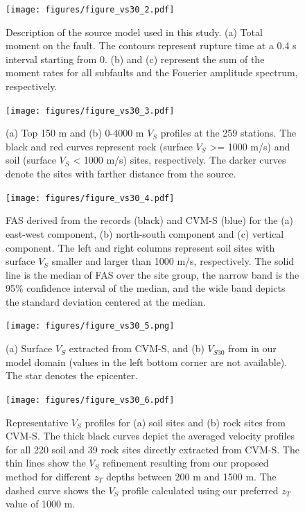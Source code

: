 \clearpage
\begin{figure}[!ht]
  \centering
  \texttt{[image: figures/figure\_vs30\_2.pdf]}
  \caption{Description of the source model used in this study. (a) Total moment on the fault. The contours represent rupture time at a 0.4 s interval starting from 0. (b) and (c) represent the sum of the moment rates for all subfaults and the Fouerier amplitude spectrum, respectively.}
  \label{fig:vs30-2}
\end{figure}

\clearpage
\begin{figure}[!ht]
  \centering
  \texttt{[image: figures/figure\_vs30\_3.pdf]}
  \caption{(a) Top 150 m and (b) 0-4000 m $V_S$ profiles at the 259 stations. The black and red curves represent rock (surface $V_S$ >= 1000 m/s) and soil (surface $V_S$ < 1000 m/s) sites, respectively. The darker curves denote the sites with farther distance from the source.}
  \label{fig:vs30-3}
\end{figure}

\clearpage
\begin{figure}[!ht]
  \centering
  \texttt{[image: figures/figure\_vs30\_4.pdf]}
  \caption{FAS derived from the records (black) and CVM-S (blue) for the (a) east-west component, (b) north-south component and (c) vertical component. The left and right columns represent soil sites with surface $V_S$ smaller and larger than 1000 m/s, respectively. The solid line is the median of FAS over the site group, the narrow band is the 95\% confidence interval of the median, and the wide band depicts the standard deviation centered at the median.
  }
  \label{fig:vs30-4}
\end{figure}

\clearpage
\begin{figure}[!ht]
  \centering
  \texttt{[image: figures/figure\_vs30\_5.png]}
  \caption{(a) Surface $V_S$ extracted from CVM-S, and (b) $V_{S30}$ from \citet{thompsonUpdatedVs30Map2018} in our model domain (values in the left bottom corner are not available). The star denotes the epicenter.}
  \label{fig:vs30-5}
\end{figure}

\clearpage
\begin{figure}[!ht]
  \centering
  \texttt{[image: figures/figure\_vs30\_6.pdf]}
  \caption{Representative $V_S$ profiles for (a) soil sites and (b) rock sites from CVM-S. The thick black curves depict the averaged velocity profiles for all 220 soil and 39 rock sites directly extracted from CVM-S. The thin lines show the $V_S$ refinement resulting from our proposed method for different $z_T$ depths between 200 m and 1500 m. The dashed curve shows the $V_S$ profile calculated using our preferred $z_T$ value of 1000 m.}
  \label{fig:vs30-6}
\end{figure}

